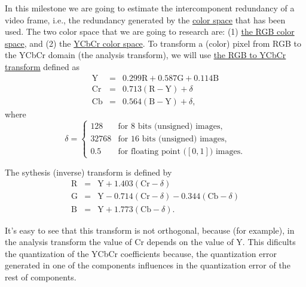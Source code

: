 In this milestone we are going to estimate the intercomponent
redundancy of a video frame, i.e., the redundancy generated by the
\href{https://en.wikipedia.org/wiki/Color_space}{color space} that has
been used. The two color space that we are going to research are: (1)
\href{https://en.wikipedia.org/wiki/RGB_color_model}{the RGB color
  space}, and (2) the \href{https://en.wikipedia.org/wiki/YCbCr}{YCbCr
  color space}. To transform a (color) pixel from RGB to the YCbCr
domain (the analysis transform), we will use
\href{https://docs.opencv.org/3.4/de/d25/imgproc_color_conversions.html}{the
  RGB to YCbCr transform} defined as
\begin{equation}
  \begin{array}{lcl}
    \text{Y}  & = & 0.299\text{R} + 0.587\text{G} + 0.114\text{B} \\
    \text{Cr} & = & 0.713(\text{R} - \text{Y}) + \delta  \\
    \text{Cb} & = & 0.564(\text{B} - \text{Y}) + \delta,
  \end{array}
\end{equation}
where
\begin{equation}
  \delta = \left\{
  \begin{array}{ll}
    128 & \text{for 8 bits (unsigned) images},\\
    32768 & \text{for 16 bits (unsigned) images},\\
    0.5 & \text{for floating point (}[0,1]\text{) images}.
  \end{array}
  \right.
\end{equation}

The sythesis (inverse) transform is defined by
\begin{equation}
  \begin{array}{lcl}
    \text{R} & = & \text{Y} + 1.403(\text{Cr} - \delta) \\
    \text{G} & = & \text{Y} - 0.714(\text{Cr} - \delta) - 0.344(\text{Cb} - \delta)\\
    \text{B} & = & \text{Y} + 1.773(\text{Cb} - \delta).
  \end{array}
\end{equation}

It's easy to see that this transform is not orthogonal, because (for
example), in the analysis transform the value of Cr depends on the
value of Y. This dificults the quantization of the YCbCr coefficients
because, the quantization error generated in one of the components
influences in the quantization error of the rest of components.

